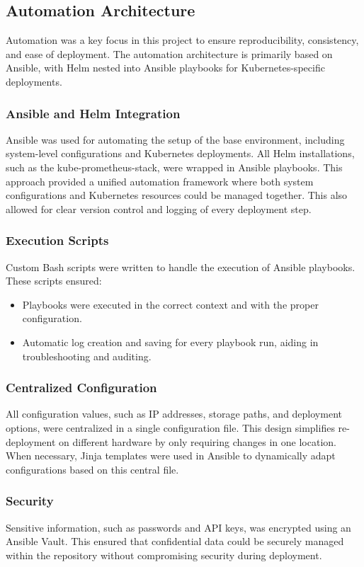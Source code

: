 \subsection{Automation Architecture}

Automation was a key focus in this project to ensure reproducibility, consistency, and ease of deployment. The automation architecture is primarily based on Ansible, with Helm nested into Ansible playbooks for Kubernetes-specific deployments.

\subsubsection{Ansible and Helm Integration}
Ansible was used for automating the setup of the base environment, including system-level configurations and Kubernetes deployments. All Helm installations, such as the kube-prometheus-stack, were wrapped in Ansible playbooks. This approach provided a unified automation framework where both system configurations and Kubernetes resources could be managed together. This also allowed for clear version control and logging of every deployment step.

\subsubsection{Execution Scripts}
Custom Bash scripts were written to handle the execution of Ansible playbooks. These scripts ensured:
\begin{itemize}
    \item Playbooks were executed in the correct context and with the proper configuration.
    \item Automatic log creation and saving for every playbook run, aiding in troubleshooting and auditing.
\end{itemize}

\subsubsection{Centralized Configuration}
All configuration values, such as IP addresses, storage paths, and deployment options, were centralized in a single configuration file. This design simplifies re-deployment on different hardware by only requiring changes in one location. When necessary, Jinja templates were used in Ansible to dynamically adapt configurations based on this central file.

\subsubsection{Security}
Sensitive information, such as passwords and API keys, was encrypted using an Ansible Vault. This ensured that confidential data could be securely managed within the repository without compromising security during deployment.



